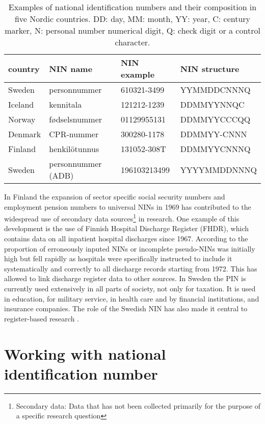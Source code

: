 \begin{table}[ht]
\centering
\begin{tabular}{llll}
\toprule
  country & NIN name & NIN example & NIN structure \\
  \hline
  Sweden & personnummer & 610321-3499 & YYMMDDCNNNQ \\
  Iceland & kennitala & 121212-1239 & DDMMYYNNQC \\
  Norway & fødselsnummer & 01129955131 & DDMMYYCCCQQ \\
  Denmark & CPR-nummer & 300280-1178 & DDMMYY-CNNN \\
  Finland & henkilötunnus & 131052-308T & DDMMYYCNNNQ \\
  \hline
  Sweden & personnummer (ADB) & 196103213499 & YYYYMMDDNNNQ \\
\bottomrule
\end{tabular}
\caption{Examples of national identification numbers and their composition in five Nordic countries. DD: day, MM: month, YY: year, C: century marker, N: personal number numerical digit, Q: check digit or a control character.}
\label{tab:nordiccomparison2}
\end{table}

In Finland the expansion of sector specific social security numbers and employment pension numbers to universal NINs in 1969 has contributed to the widespread use of secondary data sources\footnote{Secondary data: Data that has not been collected primarily for the purpose of a specific research question} in research. One example of this development is the use of Finnish Hospital Discharge Register (FHDR), which contains data on all inpatient hospital discharges since 1967. According to \citet{sund2012} the proportion of erroneously inputed NINs or incomplete pseudo-NINs was initially high but fell rapidly as hospitals were specifically instructed to include it systematically and correctly to all discharge records starting from 1972. This has allowed to link discharge register data to other sources. In Sweden the PIN is currently used extensively in all parts of society, not only for taxation. It is used in education, for military service, in health care and by financial institutions, and insurance companies. The role of the Swedish NIN has also made it central to register-based research \citep{scb2016}.

\section{Working with national identification number}

